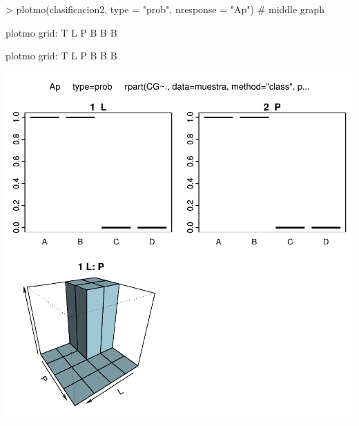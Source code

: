 \documentclass [a4paper] {article}
\begin{document}
\begin{Schunk}
\begin{Sinput}
> plotmo(clasificacion2, type = "prob", nresponse = "Ap") # middle graph
\end{Sinput}
\begin{Soutput}
 plotmo grid:    T L P
                 B B B
\end{Soutput}
\begin{Soutput}
 plotmo grid:    T L P
                 B B B
\end{Soutput}
\end{Schunk}
\includegraphics{Memoria-Figura 9}
\end{document}
